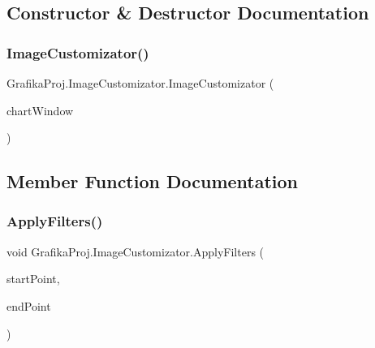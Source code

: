 \subsection{Constructor \& Destructor Documentation}
\mbox{\label{class_grafika_proj_1_1_image_customizator_a9dc6834aafa5c3039a7b465978259547}} 
\subsubsection{\texorpdfstring{ImageCustomizator()}{ImageCustomizator()}}
{\footnotesize\ttfamily Grafika\+Proj.\+Image\+Customizator.\+Image\+Customizator (\begin{DoxyParamCaption}\item[{\mbox{\hyperlink{class_grafika_proj_1_1_chart_window}{Chart\+Window}}}]{chart\+Window }\end{DoxyParamCaption})}



\subsection{Member Function Documentation}
\mbox{\label{class_grafika_proj_1_1_image_customizator_a42cae11963d0ea1c15fc61b2f057c2a9}} 
\subsubsection{\texorpdfstring{ApplyFilters()}{ApplyFilters()}}
{\footnotesize\ttfamily void Grafika\+Proj.\+Image\+Customizator.\+Apply\+Filters (\begin{DoxyParamCaption}\item[{\mbox{\hyperlink{_main_window_8xaml_8cs_af7183cff3a6e75db2170da28384d7419}{Point}}}]{start\+Point,  }\item[{\mbox{\hyperlink{_main_window_8xaml_8cs_af7183cff3a6e75db2170da28384d7419}{Point}}}]{end\+Point }\end{DoxyParamCaption})}

